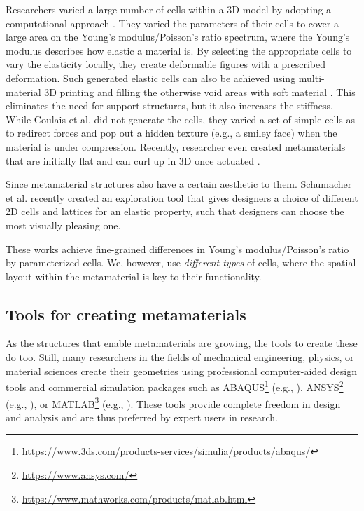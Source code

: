 {Researchers varied a large number of cells within a 3D model by adopting a computational approach \cite{Panetta2015, Schumacher2015, Panetta2017, Chen2018a}. They varied the parameters of their cells to cover a large area on the Young's modulus\slash Poisson's ratio spectrum, where the Young's modulus describes how elastic a material is. By selecting the appropriate cells to vary the elasticity locally, they create deformable figures with a prescribed deformation. Such generated elastic cells can also be achieved using multi-material 3D printing and filling the otherwise void areas with soft material \cite{Zhu2017}. This eliminates the need for support structures, but it also increases the stiffness. While Coulais et al. \cite{Coulais2016} did not generate the cells, they varied a set of simple cells as to redirect forces and pop out a hidden texture (e.g., a smiley face) when the material is under compression. Recently, researcher even created metamaterials that are initially flat and can curl up in 3D once actuated \cite{Ou2018}.



Since metamaterial structures also have a certain aesthetic to them. Schumacher et al. \cite{Schumacher2018} recently created an exploration tool that gives designers a choice of different 2D cells and lattices for an elastic property, such that designers can choose the most visually pleasing one.

These works achieve fine-grained differences in Young's modulus\slash Poisson's ratio by parameterized cells. We, however, use \textit{different types} of cells, where the spatial layout within the metamaterial is key to their functionality. 


\subsection{Tools for creating metamaterials}

As the structures that enable metamaterials are growing, the tools to create these do too. Still, many researchers in the fields of mechanical engineering, physics, or material sciences create their geometries using professional computer-aided design tools and commercial simulation packages such as ABAQUS\footnote{\url{https://www.3ds.com/products-services/simulia/products/abaqus/}} (e.g., \cite{Jiang2018, Feng2017, Overvelde2014, Shan2015, Mankame2004, Meza2015}), ANSYS\footnote{\url{https://www.ansys.com/}} (e.g., \cite{Wang2001, Rosen2007}), or MATLAB\footnote{\url{https://www.mathworks.com/products/matlab.html}} (e.g., \cite{Wang2001, Beharic2014, Mankame2004}). These tools provide complete freedom in design and analysis and are thus preferred by expert users in research.

}
